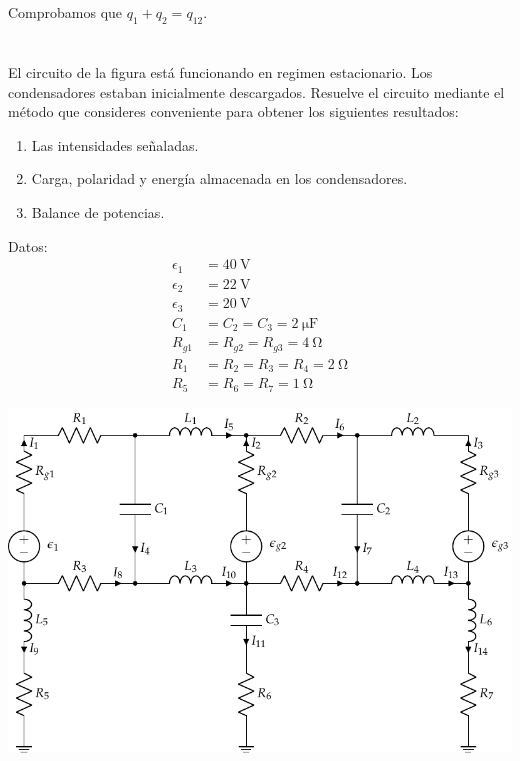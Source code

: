 \documentclass[10pt]{article}
\begin{document}
Comprobamos que $q_1 + q_2 = q_{12}$.

\clearpage


\section{}

El circuito de la figura está funcionando en regimen estacionario. Los condensadores estaban inicialmente descargados. Resuelve el circuito mediante el método que consideres conveniente para obtener los siguientes resultados:

\begin{enumerate}
\item Las intensidades señaladas.
\item Carga, polaridad y energía almacenada en los condensadores.
\item Balance de potencias.
\end{enumerate}


\begin{minipage}[c]{0.2\linewidth}
  Datos:
  \begin{align*}
    \epsilon_{1}&=\SI{40}{\volt}\\
    \epsilon_{2}&=\SI{22}{\volt}\\
    \epsilon_{3}&=\SI{20}{\volt}\\
    C_{1}&=C_{2}=C_{3}=\SI{2}{\micro\farad}\\
    R_{g1}&=R_{g2}=R_{g3}=\SI{4}{\ohm}\\
    R_{1}&=R_{2}=R_{3}=R_{4}=\SI{2}{\ohm}\\
    R_{5}&=R_{6}=R_{7}=\SI{1}{\ohm}
  \end{align*}
\end{minipage}
\begin{minipage}[c]{0.8\linewidth}
  \includegraphics[scale = 0.8]{figs/mallas_condensadores_bobinas.pdf}
\end{minipage}
\end{document}
